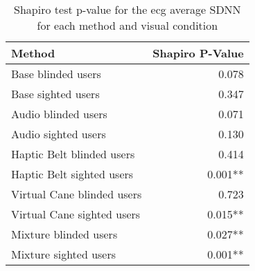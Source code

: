 
\begin{table}[!htb]
\centering
\caption{Shapiro test p-value for the ecg average SDNN for each method and visual condition}
\label{tab:shapiro_ecg_sdnn}
\begin{tabular}{lr}
\toprule
                    Method & Shapiro P-Value \\
\midrule
        Base blinded users &           0.078 \\
        Base sighted users &           0.347 \\
       Audio blinded users &           0.071 \\
       Audio sighted users &           0.130 \\
 Haptic Belt blinded users &           0.414 \\
 Haptic Belt sighted users &         0.001** \\
Virtual Cane blinded users &           0.723 \\
Virtual Cane sighted users &         0.015** \\
     Mixture blinded users &         0.027** \\
     Mixture sighted users &         0.001** \\
\bottomrule
\end{tabular}
\end{table}

